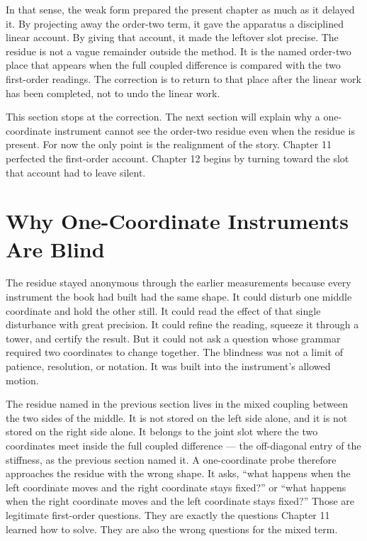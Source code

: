 In that sense, the weak form prepared the present chapter as much as it delayed
it. By projecting away the order-two term, it gave the apparatus a disciplined
linear account. By giving that account, it made the leftover slot precise. The
residue is not a vague remainder outside the method. It is the named order-two
place that appears when the full coupled difference is compared with the two
first-order readings. The correction is to return to that place after the
linear work has been completed, not to undo the linear work.

This section stops at the correction. The next section will explain why a
one-coordinate instrument cannot see the order-two residue even when the
residue is present. For now the only point is the realignment of the story.
Chapter 11 perfected the first-order account. Chapter 12 begins by turning
toward the slot that account had to leave silent.

\section{Why One-Coordinate Instruments Are Blind}

The residue stayed anonymous through the earlier measurements because every
instrument the book had built had the same shape. It could disturb one middle
coordinate and hold the other still. It could read the effect of that single
disturbance with great precision. It could refine the reading, squeeze it
through a tower, and certify the result. But it could not ask a question whose
grammar required two coordinates to change together. The blindness was not a
limit of patience, resolution, or notation. It was built into the instrument's
allowed motion.

The residue named in the previous section lives in the mixed coupling between
the two sides of the middle. It is not stored on the left side alone, and it is
not stored on the right side alone. It belongs to the joint slot where the two
coordinates meet inside the full coupled difference --- the off-diagonal entry of
the stiffness, as the previous section named it. A one-coordinate probe
therefore approaches the residue with the wrong shape. It asks, ``what happens
when the left coordinate moves and the right coordinate stays fixed?'' or
``what happens when the right coordinate moves and the left coordinate stays
fixed?'' Those are legitimate first-order questions. They are exactly the
questions Chapter 11 learned how to solve. They are also the wrong questions
for the mixed term.

